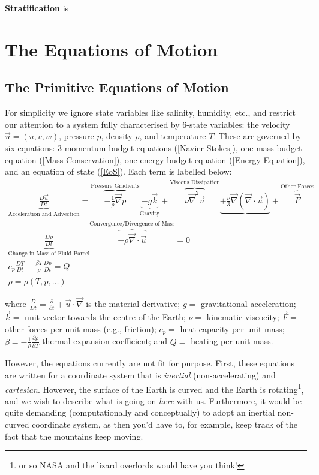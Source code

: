 \textbf{Stratification} is 

\chapter{The Equations of Motion}

\section{The Primitive Equations of Motion}

For simplicity we ignore state variables like salinity, humidity, etc., and restrict our attention to a system fully characterised by 6-state variables: the velocity $\vec{u}=(u,v,w)$, pressure $p$, density $\rho$, and temperature $T$. These are governed by six equations: 3 momentum budget equations (\ref{Navier Stokes}), one mass budget equation (\ref{Mass Conservation}), one energy budget equation (\ref{Energy Equation}), and an equation of state (\ref{EoS}). Each term is labelled below:
\begin{gather}
    \boxed{\underbrace{\frac{D\vec{u}}{Dt}}_{\text{Acceleration and Advection}}
    =\overbrace{-\frac{1}{\rho}\vec{\nabla}p}^\text{Pressure Gradients}\underbrace{-g\vec{k}}_\text{Gravity}+\overbrace{\nu\vec{\nabla}^2\vec{u}}^\text{Viscous Dissipation}\underbrace{+\frac{\nu}{3}\vec{\nabla}(\vec{\nabla}\cdot\vec{u})}_\text{}+\overbrace{\vec{F}}^\text{Other Forces}}
    \label{Navier Stokes}
    \\
    \boxed{\underbrace{\frac{D\rho}{Dt}}_\text{Change in Mass of Fluid Parcel}\overbrace{+\rho\vec{\nabla}\cdot\vec{u}}^\text{Convergence/Divergence of Mass}=0}
    \label{Mass Conservation}
    \\
    \boxed{c_p\frac{DT}{Dt}-\frac{\beta T}{\rho}\frac{Dp}{Dt}=Q}
    \label{Energy Equation}
    \\
    \boxed{\rho=\rho(T,p,\ldots)}
    \label{EoS}
\end{gather}

\noindent where $\frac{D}{Dt}=\frac{\partial}{\partial t}+\vec{u}\cdot\vec{\nabla}$ is the material derivative; $g=$ gravitational acceleration; $\vec{k}=$ unit vector towards the centre of the Earth; $\nu=$ kinematic viscocity; $\vec{F}=$ other forces per unit mass (e.g., friction); $c_p=$ heat capacity per unit mass; $\beta=-\frac{1}{\rho}\frac{\partial \rho}{\partial T}$ thermal expansion coefficient; and $Q=$ heating per unit mass.

However, the equations currently are not fit for purpose. First, these equations are written for a coordinate system that is \textit{inertial} (non-accelerating) and \textit{cartesian}. However, the surface of the Earth is curved and the Earth is rotating\footnote{or so NASA and the lizard overlords would have you think!}, and we wish to describe what is going on \textit{here} with us. Furthermore, it would be quite demanding (computationally and conceptually) to adopt an inertial non-curved coordinate system, as then you'd have to, for example, keep track of the fact that the mountains keep moving. 

